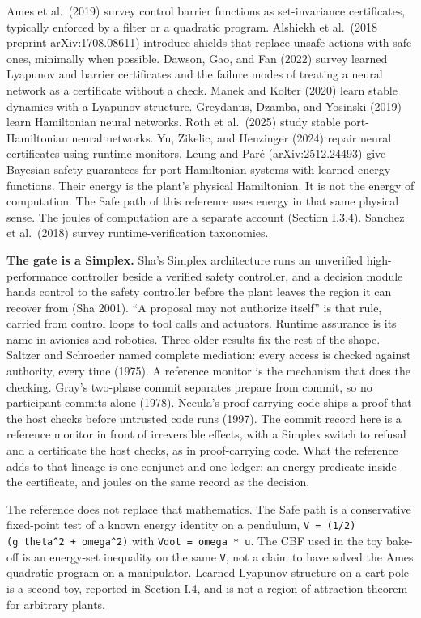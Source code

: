 \documentclass[
  10pt,
]{article}
\begin{document}
Ames et al.~(2019) survey control barrier functions as set-invariance
certificates, typically enforced by a filter or a quadratic program.
Alshiekh et al.~(2018 preprint arXiv:1708.08611) introduce shields that
replace unsafe actions with safe ones, minimally when possible. Dawson,
Gao, and Fan (2022) survey learned Lyapunov and barrier certificates and
the failure modes of treating a neural network as a certificate without
a check. Manek and Kolter (2020) learn stable dynamics with a Lyapunov
structure. Greydanus, Dzamba, and Yosinski (2019) learn Hamiltonian
neural networks. Roth et al.~(2025) study stable port-Hamiltonian neural
networks. Yu, Zikelic, and Henzinger (2024) repair neural certificates
using runtime monitors. Leung and Paré (arXiv:2512.24493) give Bayesian
safety guarantees for port-Hamiltonian systems with learned energy
functions. Their energy is the plant's physical Hamiltonian. It is not
the energy of computation. The Safe path of this reference uses energy
in that same physical sense. The joules of computation are a separate
account (Section I.3.4). Sanchez et al.~(2018) survey
runtime-verification taxonomies.

\textbf{The gate is a Simplex.} Sha's Simplex architecture runs an
unverified high-performance controller beside a verified safety
controller, and a decision module hands control to the safety controller
before the plant leaves the region it can recover from (Sha 2001). ``A
proposal may not authorize itself'' is that rule, carried from control
loops to tool calls and actuators. Runtime assurance is its name in
avionics and robotics. Three older results fix the rest of the shape.
Saltzer and Schroeder named complete mediation: every access is checked
against authority, every time (1975). A reference monitor is the
mechanism that does the checking. Gray's two-phase commit separates
prepare from commit, so no participant commits alone (1978). Necula's
proof-carrying code ships a proof that the host checks before untrusted
code runs (1997). The commit record here is a reference monitor in front
of irreversible effects, with a Simplex switch to refusal and a
certificate the host checks, as in proof-carrying code. What the
reference adds to that lineage is one conjunct and one ledger: an energy
predicate inside the certificate, and joules on the same record as the
decision.

The reference does not replace that mathematics. The Safe path is a
conservative fixed-point test of a known energy identity on a pendulum,
\texttt{V\ =\ (1/2)(g\ theta\^{}2\ +\ omega\^{}2)} with
\texttt{Vdot\ =\ omega\ *\ u}. The CBF used in the toy bake-off is an
energy-set inequality on the same \texttt{V}, not a claim to have solved
the Ames quadratic program on a manipulator. Learned Lyapunov structure
on a cart-pole is a second toy, reported in Section I.4, and is not a
region-of-attraction theorem for arbitrary plants.
\end{document}
